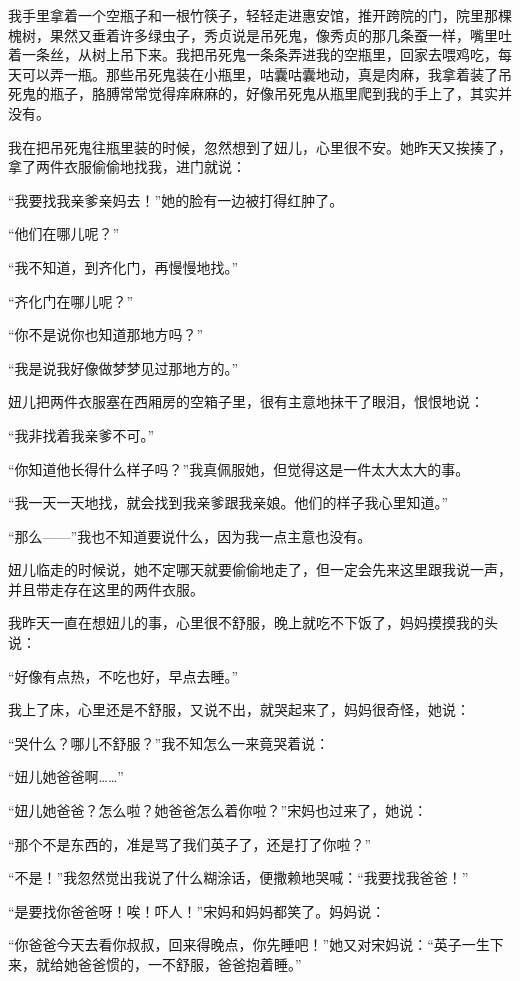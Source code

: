 \par 我手里拿着一个空瓶子和一根竹筷子，轻轻走进惠安馆，推开跨院的门，院里那棵槐树，果然又垂着许多绿虫子，秀贞说是吊死鬼，像秀贞的那几条蚕一样，嘴里吐着一条丝，从树上吊下来。我把吊死鬼一条条弄进我的空瓶里，回家去喂鸡吃，每天可以弄一瓶。那些吊死鬼装在小瓶里，咕囊咕囊地动，真是肉麻，我拿着装了吊死鬼的瓶子，胳膊常常觉得痒麻麻的，好像吊死鬼从瓶里爬到我的手上了，其实并没有。
\par 我在把吊死鬼往瓶里装的时候，忽然想到了妞儿，心里很不安。她昨天又挨揍了，拿了两件衣服偷偷地找我，进门就说：
\par “我要找我亲爹亲妈去！”她的脸有一边被打得红肿了。
\par “他们在哪儿呢？”
\par “我不知道，到齐化门，再慢慢地找。”
\par “齐化门在哪儿呢？”
\par “你不是说你也知道那地方吗？”
\par “我是说我好像做梦梦见过那地方的。”
\par 妞儿把两件衣服塞在西厢房的空箱子里，很有主意地抹干了眼泪，恨恨地说：
\par “我非找着我亲爹不可。”
\par “你知道他长得什么样子吗？”我真佩服她，但觉得这是一件太大太大的事。
\par “我一天一天地找，就会找到我亲爹跟我亲娘。他们的样子我心里知道。”
\par “那么——”我也不知道要说什么，因为我一点主意也没有。
\par 妞儿临走的时候说，她不定哪天就要偷偷地走了，但一定会先来这里跟我说一声，并且带走存在这里的两件衣服。
\par 我昨天一直在想妞儿的事，心里很不舒服，晚上就吃不下饭了，妈妈摸摸我的头说：
\par “好像有点热，不吃也好，早点去睡。”
\par 我上了床，心里还是不舒服，又说不出，就哭起来了，妈妈很奇怪，她说：
\par “哭什么？哪儿不舒服？”我不知怎么一来竟哭着说：
\par “妞儿她爸爸啊……”
\par “妞儿她爸爸？怎么啦？她爸爸怎么着你啦？”宋妈也过来了，她说：
\par “那个不是东西的，准是骂了我们英子了，还是打了你啦？”
\par “不是！”我忽然觉出我说了什么糊涂话，便撒赖地哭喊：“我要找我爸爸！”
\par “是要找你爸爸呀！唉！吓人！”宋妈和妈妈都笑了。妈妈说：
\par “你爸爸今天去看你叔叔，回来得晚点，你先睡吧！”她又对宋妈说：“英子一生下来，就给她爸爸惯的，一不舒服，爸爸抱着睡。”

